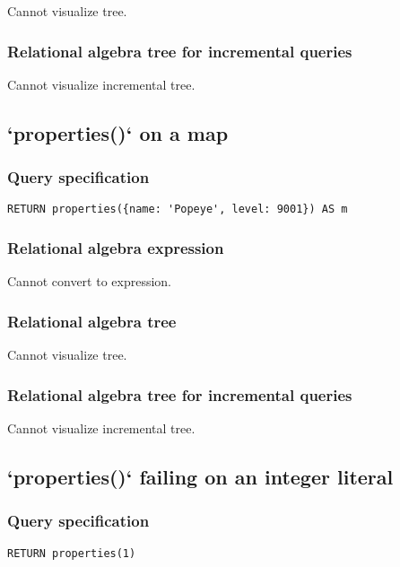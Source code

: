 Cannot visualize tree.

\subsubsection*{Relational algebra tree for incremental queries}

Cannot visualize incremental tree.

\subsection{`properties()` on a map}

\subsubsection*{Query specification}

\begin{lstlisting}
RETURN properties({name: 'Popeye', level: 9001}) AS m
\end{lstlisting}

\subsubsection*{Relational algebra expression}

Cannot convert to expression.

\subsubsection*{Relational algebra tree}

Cannot visualize tree.

\subsubsection*{Relational algebra tree for incremental queries}

Cannot visualize incremental tree.

\subsection{`properties()` failing on an integer literal}

\subsubsection*{Query specification}

\begin{lstlisting}
RETURN properties(1)
\end{lstlisting}

